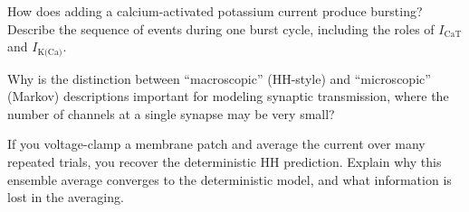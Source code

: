 \begin{conceptquestions}
  \item How does adding a calcium-activated potassium current produce bursting? Describe the sequence of events during one burst cycle, including the roles of $I_{\text{CaT}}$ and $I_{\text{K(Ca)}}$.

  \item Why is the distinction between ``macroscopic'' (HH-style) and ``microscopic'' (Markov) descriptions important for modeling synaptic transmission, where the number of channels at a single synapse may be very small?

  \item If you voltage-clamp a membrane patch and average the current over many repeated trials, you recover the deterministic HH prediction. Explain why this ensemble average converges to the deterministic model, and what information is lost in the averaging.
\end{conceptquestions}
